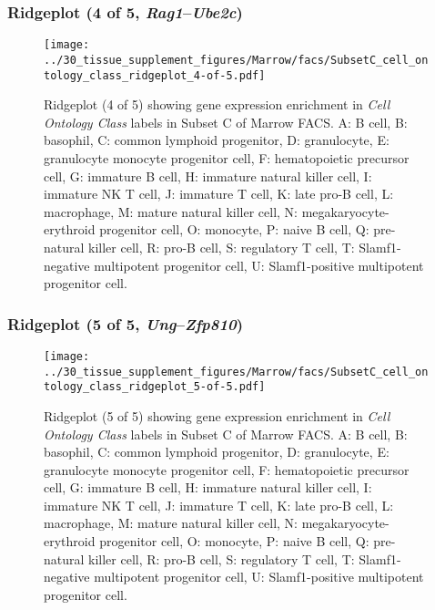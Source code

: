 \subsubsection{Ridgeplot (4 of 5, \emph{Rag1}--\emph{Ube2c})}
\begin{figure}[h]
\centering
\texttt{[image: ../30\_tissue\_supplement\_figures/Marrow/facs/SubsetC\_cell\_ontology\_class\_ridgeplot\_4-of-5.pdf]}

\caption{ Ridgeplot (4 of 5)  showing gene expression enrichment in \emph{Cell Ontology Class} labels in Subset C of Marrow FACS. A: B cell, B: basophil, C: common lymphoid progenitor, D: granulocyte, E: granulocyte monocyte progenitor cell, F: hematopoietic precursor cell, G: immature B cell, H: immature natural killer cell, I: immature NK T cell, J: immature T cell, K: late pro-B cell, L: macrophage, M: mature natural killer cell, N: megakaryocyte-erythroid progenitor cell, O: monocyte, P: naive B cell, Q: pre-natural killer cell, R: pro-B cell, S: regulatory T cell, T: Slamf1-negative multipotent progenitor cell, U: Slamf1-positive multipotent progenitor cell.}
\end{figure}


\clearpage

\subsubsection{Ridgeplot (5 of 5, \emph{Ung}--\emph{Zfp810})}
\begin{figure}[h]
\centering
\texttt{[image: ../30\_tissue\_supplement\_figures/Marrow/facs/SubsetC\_cell\_ontology\_class\_ridgeplot\_5-of-5.pdf]}

\caption{ Ridgeplot (5 of 5)  showing gene expression enrichment in \emph{Cell Ontology Class} labels in Subset C of Marrow FACS. A: B cell, B: basophil, C: common lymphoid progenitor, D: granulocyte, E: granulocyte monocyte progenitor cell, F: hematopoietic precursor cell, G: immature B cell, H: immature natural killer cell, I: immature NK T cell, J: immature T cell, K: late pro-B cell, L: macrophage, M: mature natural killer cell, N: megakaryocyte-erythroid progenitor cell, O: monocyte, P: naive B cell, Q: pre-natural killer cell, R: pro-B cell, S: regulatory T cell, T: Slamf1-negative multipotent progenitor cell, U: Slamf1-positive multipotent progenitor cell.}
\end{figure}


\clearpage

